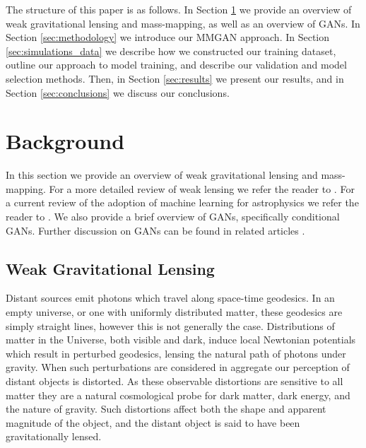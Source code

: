 \documentclass[fleqn,usenatbib]{mnras}
\begin{document}
The structure of this paper is as follows. In Section \ref{sec:background} we provide an overview of weak gravitational lensing and mass-mapping,
as well as an overview of GANs. In Section \ref{sec:methodology} we introduce our MMGAN approach. In Section \ref{sec:simulations_data} we describe how we constructed our training dataset, outline our approach to model training, and describe our validation and model selection methods. Then, in Section \ref{sec:results} we present our results, and in Section \ref{sec:conclusions} we discuss our conclusions.

\section{Background}\label{sec:background}

In this section we provide an overview of weak gravitational lensing and mass-mapping. For a more detailed review of weak lensing we refer the reader to \citet{bartelmann2001weak}. For a current review of the adoption of machine learning for astrophysics we refer the reader to \citet{lanusse2023dawes}. We also provide a brief overview of GANs, 
specifically conditional GANs. Further discussion on GANs can be found in related articles \citep{goodfellow2014generative, mirza2014conditional,goodfellow2020generative,creswell2018generative}.

\subsection{Weak Gravitational Lensing}\label{subsec:weak_lensing}

Distant sources emit photons which travel along space-time geodesics. In an empty universe, or one with uniformly distributed matter, these geodesics are simply straight lines, however this is not generally the case. 
Distributions of matter in the Universe, both visible and dark, induce local Newtonian potentials which result in perturbed geodesics, lensing the natural path of photons under gravity. When such perturbations are considered in aggregate our perception of distant objects is distorted. As these observable distortions are sensitive to all matter they are a natural cosmological probe for dark matter, dark energy, and the nature of gravity. Such distortions affect both the shape and apparent magnitude of the object, and the distant object is said to have been gravitationally lensed.
\end{document}
